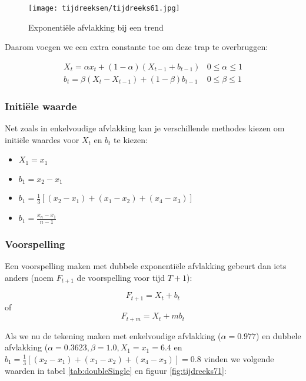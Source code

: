 \begin{figure}
  \centering
  \texttt{[image: tijdreeksen/tijdreeks61.jpg]}
  \caption{Exponentiële afvlakking bij een trend}
  \label{fig:tijdreeks61}
\end{figure}

Daarom voegen we een extra constante toe om deze trap te overbruggen:

\begin{definition}
\begin{eqnarray}
	X_{t} = \alpha x_{t} + (1-\alpha)(X_{t-1} + b_{t-1}) & 0 \leq \alpha \leq 1 \\
	b_{t} = \beta(X_{t}-X_{t-1}) + (1-\beta)b_{t-1} & 0 \leq \beta \leq 1 
\label{eq:doubleSmoothing}
\end{eqnarray}
\end{definition}

\subsubsection{Initiële waarde}

Net zoals in enkelvoudige afvlakking kan je verschillende methodes kiezen om initiële waardes voor $X_{t}$ en $b_{t}$ te kiezen:

\begin{itemize}
	\item $X_{1} = x_{1}$
	\item $b_{1} = x_{2} - x_{1}$
	\item $b_{1} = \frac{1}{3}\left[ (x_{2} - x_{1}) + (x_{1} - x_{2}) + (x_{4} - x_{3}) \right]$
	\item $b_{1} = \frac{x_{n} - x_{1}}{n-1}$
\end{itemize}

\subsubsection{Voorspelling}

Een voorspelling maken met dubbele exponentiële afvlakking gebeurt dan iets anders (noem $F_{t+1}$ de voorspelling voor tijd $T+1$):

\[ F_{t+1} = X_{t} + b_{t} \]
of
\[ F_{t+m} = X_{t} + m b_{t} \]

Als we nu de tekening maken met enkelvoudige afvlakking ($\alpha = 0.977$) en dubbele afvlakking ($\alpha = 0.3623, \beta = 1.0, X_{1} = x_{1} = 6.4$ en $b_{1} = \frac{1}{3}\left[ (x_{2} - x_{1}) + (x_{1} - x_{2}) + (x_{4} - x_{3}) \right] = 0.8$ vinden we volgende waarden in tabel \ref{tab:doubleSingle} en figuur \ref{fig:tijdreeks71}:

